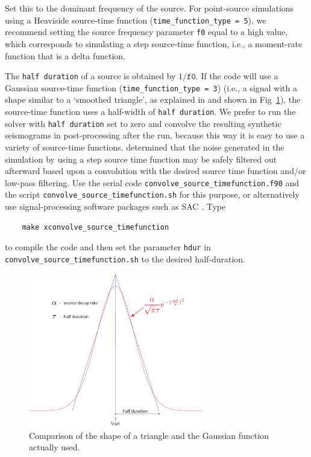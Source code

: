 \begin{description}[font=\ttfamily]
\item[f0] Set this to the dominant frequency of the source.
For point-source simulations using a Heaviside source-time function (\texttt{time\_function\_type = 5}),
we recommend setting the source frequency parameter \texttt{f0}
equal to a high value, which corresponds to simulating a step source-time
function, i.e., a moment-rate function that is a delta function.

The \texttt{half duration} of a source is obtained by $1/\mathtt{f0}$.
If the code will use a Gaussian source-time function (\texttt{time\_function\_type = 3})
(i.e., a signal with a shape similar to a `smoothed triangle', as
explained in \citet{KoTr02a} and shown in Fig~\ref{fig:gauss.vs.triangle}), the
source-time function uses a half-width of \texttt{half duration}. We prefer
to run the solver with \texttt{half duration} set to zero and convolve
the resulting synthetic seismograms in post-processing after the run,
because this way it is easy to use a variety of source-time functions.
\citet{KoTr02a} determined
that the noise generated in the simulation by using a step source
time function may be safely filtered out afterward based upon a convolution
with the desired source time function and/or low-pass filtering. Use
the serial code \texttt{convolve\_source\_timefunction.f90} and the
script \texttt{convolve\_source\_timefunction.sh} for this purpose,
or alternatively use signal-processing software packages such as SAC .
Type
%
\begin{verbatim}
    make xconvolve_source_timefunction
\end{verbatim}
%
to compile the code and then set the parameter \texttt{hdur} in \texttt{convolve\_source\_timefunction.sh}
to the desired half-duration.
\begin{figure}[htbp]
\centering
\includegraphics[width=3in]{figures/gauss_vs_triangle_mod.pdf}
\caption{Comparison of the shape of a triangle and the Gaussian function actually
used.}
\label{fig:gauss.vs.triangle}
\end{figure}


\end{description}
